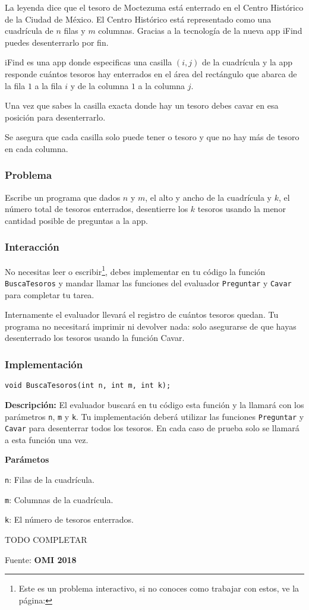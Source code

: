 \problembreak

\problemtitle La leyenda dice que el tesoro de Moctezuma está enterrado en el Centro Histórico de la Ciudad de México. El Centro Histórico está representado como una cuadrícula de \(n\) filas y \(m\) columnas. Gracias a la tecnología de la nueva app iFind puedes desenterrarlo por fin.
 
 iFind es una app donde especificas una casilla \((i,j)\) de la cuadrícula y la app responde cuántos tesoros hay enterrados en el área del rectángulo que abarca de la fila \(1\) a la fila \(i\) y de la columna \(1\) a la columna \(j\).
 
 Una vez que sabes la casilla exacta donde hay un tesoro debes cavar en esa posición para desenterrarlo.
 
 Se asegura que cada casilla solo puede tener  o  tesoro y que no hay más de  tesoro en cada columna.
 
 \subsubsection*{Problema}
 Escribe un programa que dados \(n\) y \(m\), el alto y ancho de la cuadrícula y \(k\), el número total de tesoros enterrados, desentierre los \(k\) tesoros usando la menor cantidad posible de preguntas a la app.
 
 \subsubsection*{Interacción}
 No necesitas leer o escribir\footnote{Este es un problema interactivo, si no conoces como trabajar con estos, ve la página: \pageref{interactivos}}, debes implementar en tu código la función \verb|BuscaTesoros| y mandar llamar las funciones del evaluador \verb|Preguntar| y \verb|Cavar| para completar tu tarea.
 
 Internamente el evaluador llevará el registro de cuántos tesoros quedan. Tu programa no necesitará imprimir ni devolver nada: solo asegurarse de que hayas desenterrado los  tesoros usando la función Cavar.
 
\subsubsection*{Implementación}
\verb|void BuscaTesoros(int n, int m, int k);|

\textbf{Descripción:} El evaluador buscará en tu código esta función y la llamará con los parámetros \verb|n|, \verb|m| y \verb|k|. Tu implementación deberá utilizar las funciones \verb|Preguntar| y \verb|Cavar| para desenterrar todos los tesoros. En cada caso de prueba solo se llamará a esta función una vez.

\textbf{Parámetos}
\vspace{-\baselineskip}
\begin{plimits}
	\item \verb|n|: Filas de la cuadrícula.
	\item \verb|m|: Columnas de la cuadrícula.
	\item \verb|k|:  El número de tesoros enterrados.
\end{plimits}

TODO COMPLETAR

Fuente: \textbf{OMI 2018}
 

\problembreak